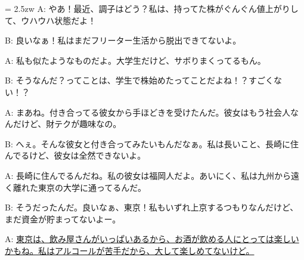 \documentclass[11pt]{amsart}
\title{}
\author{}
\newenvironment{hangall}[1]{\hangindent = 2.5zw\everypar{\hangindent = 2.5zw}}{}
\begin{document}
\maketitle
\begin{hangall}{}%
A: やあ！最近、調子はどう？私は、持ってた株がぐんぐん値上がりして、ウハウハ状態だよ！

B: 良いなぁ！私はまだフリーター生活から脱出できてないよ。

A: 私も似たようなものだよ。大学生だけど、サボりまくってるもん。

B: そうなんだ？ってことは、学生で株始めたってことだよね！？すごくない！？

A: まあね。付き合ってる彼女から手ほどきを受けたんだ。彼女はもう社会人なんだけど、財テクが趣味なの。

B: へぇ。そんな彼女と付き合ってみたいもんだなぁ。私は長いこと、長崎に住んでるけど、彼女は全然できないよ。

A: 長崎に住んでるんだね。私の彼女は福岡人だよ。あいにく、私は九州から遠く離れた東京の大学に通ってるんだ。

B: そうだったんだ。良いなぁ、東京！私もいずれ上京するつもりなんだけど、まだ資金が貯まってないよー。

A: \ul{東京は、飲み屋さんがいっぱいあるから、お酒が飲める人にとっては楽しいかもね。私はアルコールが苦手だから、大して楽しめてないけど。}\end{hangall}
\end{document}
